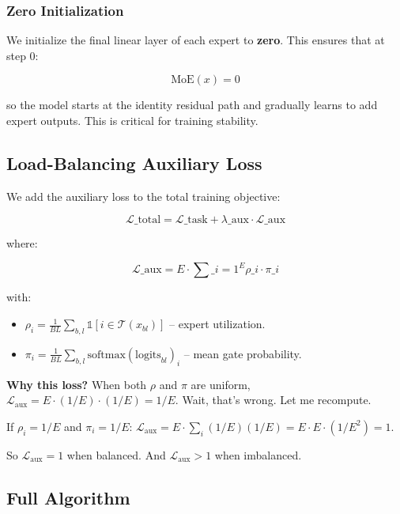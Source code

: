 \subsubsection{Zero Initialization}

We initialize the final linear layer of each expert to \textbf{zero}. This ensures 
that at step 0:

\[
\text{MoE}(x) = 0
\tag{4.11}
\]

so the model starts at the identity residual path and gradually learns to 
add expert outputs. This is critical for training stability.

\subsection{Load-Balancing Auxiliary Loss}

We add the auxiliary loss to the total training objective:

\[
\mathcal{L}\_\text{total} = \mathcal{L}\_\text{task} + \lambda\_\text{aux} \cdot \mathcal{L}\_\text{aux}
\tag{4.12}
\]

where:

\[
\mathcal{L}\_\text{aux} = E \cdot \sum\_{i=1}^{E} \rho\_i \cdot \pi\_i
\tag{4.13}
\]

with:
\begin{itemize}
\item $\rho_i = \frac{1}{BL} \sum_{b,l} \mathbb{1}[i \in \mathcal{T}(x_{bl})]$ -- expert utilization.
\item $\pi_i = \frac{1}{BL} \sum_{b,l} \text{softmax}(\text{logits}_{bl})_i$ -- mean gate probability.

\end{itemize}
\textbf{Why this loss?} When both $\rho$ and $\pi$ are uniform, 
$\mathcal{L}_\text{aux} = E \cdot (1/E) \cdot (1/E) = 1/E$. Wait, that's 
wrong. Let me recompute.

If $\rho_i = 1/E$ and $\pi_i = 1/E$:
$\mathcal{L}_\text{aux} = E \cdot \sum_i (1/E)(1/E) = E \cdot E \cdot (1/E^2) = 1$.

So $\mathcal{L}_\text{aux} = 1$ when balanced. And $\mathcal{L}_\text{aux} > 1$ 
when imbalanced.

\subsection{Full Algorithm}

